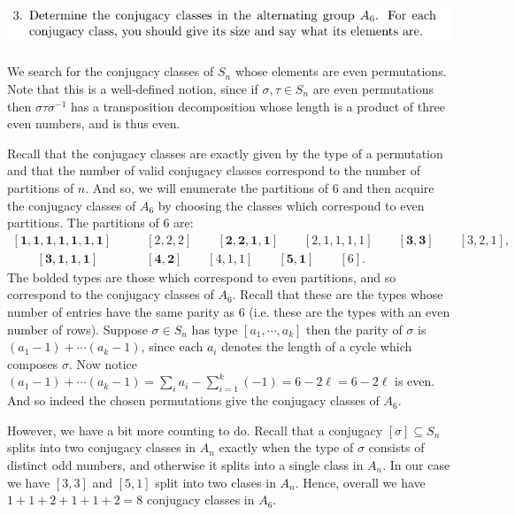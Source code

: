 \documentclass[12pt,letterpaper,boxed]{hmcpset}
\newcommand{\inv}{^{-1}}
\begin{document}
\begin{problem}
	\includegraphics[scale=0.8]{3.png}
	\hfill
\end{problem}
\begin{solution}
We search for the conjugacy classes of $S_n$ whose elements are even
permutations. Note that this is a well-defined notion, since if
$\sigma, \tau \in S_n$ are even permutations then $\sigma \tau
\sigma\inv$ has a transposition decomposition whose length is a
product of three even numbers, and is thus even.

Recall that the conjugacy classes are exactly given by the type of a
permutation and that the number of valid conjugacy classes
correspond to the number of partitions of $n$. And so, we will
enumerate the partitions of $6$ and then acquire the conjugacy classes
of $A_6$ by choosing the classes which correspond to even partitions.
The partitions of $6$ are:
\begin{align*}
	\mathbf{[1,1,1,1,1,1,1]} &\qquad [2,2,2] \qquad \mathbf{[2,2,1,1]} \qquad [2,1,1,1,1]
	\qquad \mathbf{[3,3]} \qquad [3,2,1], \\ \qquad \mathbf{[3,1,1,1]}
	&\qquad \mathbf{[4,2]} \qquad [4,1,1] \qquad \mathbf{[5,1]} \qquad [6]. 
\end{align*}
The bolded types are those which correspond to even partitions, and so
correspond to the conjugacy classes of $A_6$. Recall that these are the types
whose number of entries have the same parity as $6$ (i.e. these are
the types with an even number of rows). Suppose $\sigma \in S_n$ has
type $[a_1, \cdots, a_k]$ then the parity of $\sigma$ is 
$(a_1 - 1) + \cdots (a_k -1)$, since each $a_i$ denotes the length of
a cycle which composes $\sigma$. Now notice 
$(a_1 -1) + \cdots (a_k -1) = \sum_i a_i - \sum_{i=1}^{k} (-1) = 6 -
2\ell = 6 - 2\ell$ is even. And so indeed the chosen permutations give
the conjugacy classes of $A_6$. 

However, we have a bit more counting to do. Recall that a conjugacy
$[\sigma] \subseteq S_n$ splits into two conjugacy classes in $A_n$
exactly when the type of $\sigma$ consists of distinct odd numbers,
and otherwise it splits into a single class in $A_n$. 
In our case we have $[3,3]$ and $[5,1]$ split into two clases in
$A_n$. Hence, overall we have $1 + 1 + 2 + 1 + 1 + 2 = 8$ conjugacy
classes in $A_6$. 


\end{solution}
\end{document}
